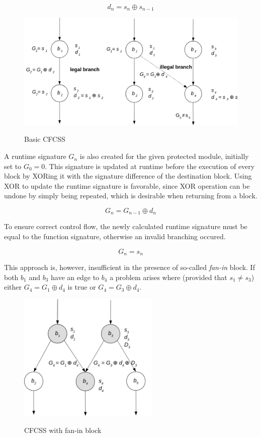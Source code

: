 \documentclass[12pt, letterpaper]{article}
\begin{document}
\[
d_n = s_n \oplus s_{n-1}
\]

\begin{figure}[hbt]
    \centering
    \includegraphics[width=1.0\textwidth]{diagrams/cfcss/basic.png}
    \caption{Basic CFCSS}
    \cite{coast:cfcss}
\end{figure}

A runtime signature {$G_n$} is also created for the given protected module, initially set to {$G_0 = 0$}. This signature is updated at runtime before the execution of every block by XORing it with the signature difference of the destination block. Using XOR to update the runtime signature is favorable, since XOR operation can be undone by simply being repeated, which is desirable when returning from a block.

\[
G_n = G_{n-1} \oplus d_n
\]

To ensure correct control flow, the newly calculated runtime signature must be equal to the function signature, otherwise an invalid branching occured.

\[
G_n = s_n
\]

This approach is, however, insufficient in the presence of so-called \textit{fan-in} block. If both {$b_1$} and {$b_3$} have an edge to {$b_4$} a problem arises where (provided that {$s_1 \ne s_3$}) either {$G_4 = G_1 \oplus d_4$} is true or {$G_4 = G_3 \oplus d_4$}.

\begin{figure}[hbt]
    \centering
    \includegraphics[width=0.6\textwidth]{diagrams/cfcss/adjuster.png}
    \caption{CFCSS with fan-in block}
    \cite{coast:cfcss}
\end{figure}
\end{document}
